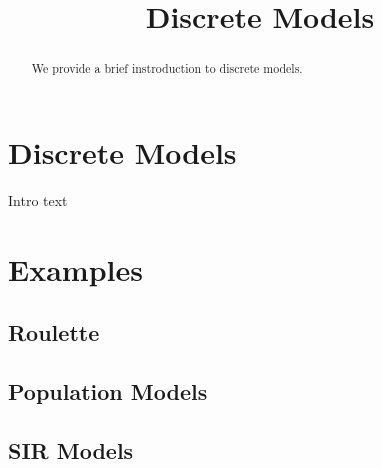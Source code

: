 \documentclass{ximera}
\title{Discrete Models}
\begin{document}
  
\begin{abstract}  
We provide a brief instroduction to discrete models.
\end{abstract}  
\maketitle

\section{Discrete Models}

Intro text

\section{Examples}

\subsection{Roulette}

\subsection{Population Models}

\subsection{SIR Models}
\end{document}
